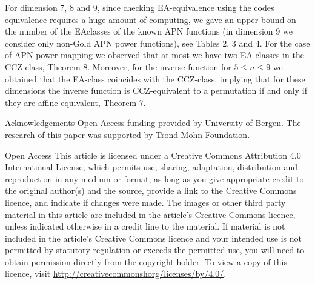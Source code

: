 \documentclass[10pt]{article}
\begin{document}
For dimension 7, 8 and 9, since checking EA-equivalence using the codes equivalence requires a huge amount of computing, we gave an upper bound on the number of the EAclasses of the known APN functions (in dimension 9 we consider only non-Gold APN power functions), see Tables 2, 3 and 4. For the case of APN power mapping we observed that at most we have two EA-classes in the CCZ-class, Theorem 8. Moreover, for the inverse function for $5 \leq n \leq 9$ we obtained that the EA-class coincides with the CCZ-class, implying that for these dimensions the inverse function is CCZ-equivalent to a permutation if and only if they are affine equivalent, Theorem 7.

Acknowledgements Open Access funding provided by University of Bergen. The research of this paper was supported by Trond Mohn Foundation.

Open Access This article is licensed under a Creative Commons Attribution 4.0 International License, which permits use, sharing, adaptation, distribution and reproduction in any medium or format, as long as you give appropriate credit to the original author(s) and the source, provide a link to the Creative Commons licence, and indicate if changes were made. The images or other third party material in this article are included in the article's Creative Commons licence, unless indicated otherwise in a credit line to the material. If material is not included in the article's Creative Commons licence and your intended use is not permitted by statutory regulation or exceeds the permitted use, you will need to obtain permission directly from the copyright holder. To view a copy of this licence, visit \href{http://creativecommonshorg/licenses/by/4.0/}{http://creativecommonshorg/licenses/by/4.0/}.
\end{document}
